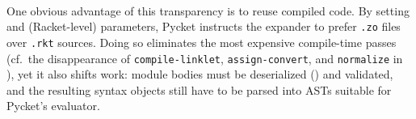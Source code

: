 		\paragraph{}%
			One obvious advantage of this transparency is to reuse compiled code. By setting  and  (Racket-level) parameters, Pycket instructs the expander to prefer \texttt{.zo} files over \texttt{.rkt} sources. Doing so eliminates the most expensive compile-time passes (cf.\ the disappearance of \texttt{compile-linklet}, \texttt{assign-convert}, and \texttt{normalize} in ), yet it also shifts work: module bodies must be deserialized () and validated, and the resulting syntax objects still have to be parsed into ASTs suitable for Pycket's evaluator.

